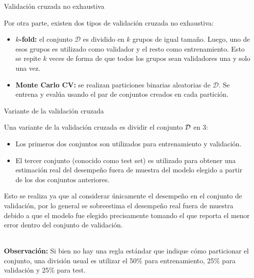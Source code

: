 \documentclass[9pt, handout]{beamer}
\begin{document}
\begin{frame}{Validación cruzada no exhaustiva}
	
Por otra parte, existen dos tipos de validación cruzada no exhaustiva: \pause
	
\begin{itemize}
	\item \textbf{$k$-fold:} el conjunto $\mathcal{D}$ es dividido en $k$ grupos de igual tamaño. Luego, uno de esos grupos es utilizado como validador y el resto como entrenamiento. Esto se repite $k$ veces de forma de que todos los grupos sean validadores una y solo una vez.\pause
	\item \textbf{Monte Carlo CV:} se realizan particiones binarias aleatorias de $\mathcal{D}$. Se entrena y evalúa usando el par de conjuntos creados en cada partición.
\end{itemize}

\end{frame}

\begin{frame}{Variante de la validación cruzada}

Una variante de la validación cruzada es dividir el conjunto ${\mathcal D}$ en 3: \pause

\begin{itemize}
	\item Los primeros dos conjuntos son utilizados para entrenamiento y validación. \pause
	\item El tercer conjunto (conocido como test set) es utilizado para obtener una estimación real del desempeño fuera de muestra del modelo elegido a partir de los dos conjuntos anteriores. \pause
\end{itemize}

Esto se realiza ya que al considerar únicamente el desempeño en el conjunto de validación, por lo general se sobreestima el desempeño real fuera de muestra debido a que el modelo fue elegido precisamente tomando el que reporta el menor error dentro del conjunto de validación.\\~\ \pause

\textbf{Observación:} Si bien no hay una regla estándar que indique cómo particionar el conjunto, una división usual es utilizar el 50\% para entrenamiento, 25\% para validación y 25\% para test.
	
\end{frame}
\end{document}
